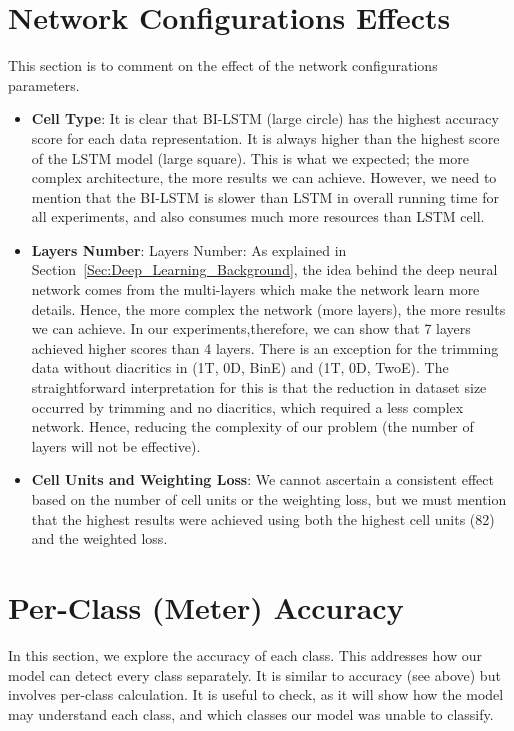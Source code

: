 \section{Network Configurations Effects}

This section is to comment on the effect of the network configurations parameters.
\begin{itemize}

\item \textbf{Cell Type}: It is clear that BI-LSTM (large circle) has the highest accuracy score for each data representation. It is always higher than the highest score of the LSTM model (large square). This is what we expected; the more complex architecture, the more results we can achieve. However, we need to mention that the BI-LSTM is slower than LSTM in overall running time for all experiments, and also consumes much more resources than LSTM cell.
\item \textbf{Layers Number}: Layers Number: As explained in Section~\ref{Sec:Deep_Learning_Background}, the idea behind the deep neural network comes from the multi-layers which make the network learn more details. Hence, the more complex the network (more layers), the more results we can achieve. In our experiments,therefore, we can show that 7 layers achieved higher scores than 4 layers. There is an exception for the trimming data without diacritics in (1T, 0D, BinE) and (1T, 0D, TwoE). The straightforward interpretation for this is that the reduction in dataset size occurred by trimming and no diacritics, which required a less complex network. Hence, reducing the complexity of our problem (the number of layers will not be effective).
\item \textbf{Cell Units and Weighting Loss}: We cannot ascertain a consistent effect based on the number of cell units or the weighting loss, but we must mention that the highest results were achieved using both the highest cell units (82) and the weighted loss.

\end{itemize}



\section{Per-Class (Meter) Accuracy}

In this section, we explore the accuracy of each class. This addresses how our model can detect every class separately. It is similar to accuracy (see above) but involves per-class calculation. It is useful to check, as it will show how the model may understand each class, and which classes our model was unable to classify. 

